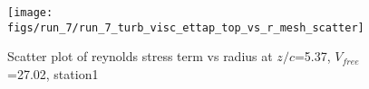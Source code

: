 \begin{figure}[H]
\centering
\texttt{[image: figs/run\_7/run\_7\_turb\_visc\_ettap\_top\_vs\_r\_mesh\_scatter]}
\caption{Scatter plot of reynolds stress term vs radius at $z/c$=5.37, $V_{free}$=27.02, station1}
\label{fig:run_7_turb_visc_ettap_top_vs_r_mesh_scatter}
\end{figure}


